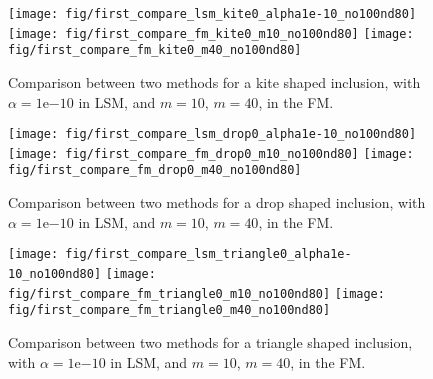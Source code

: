 \begin{center}
\begin{figure}%
{
\texttt{[image: fig/first\_compare\_lsm\_kite0\_alpha1e-10\_no100nd80]}
}
{
\texttt{[image: fig/first\_compare\_fm\_kite0\_m10\_no100nd80]}
}
{
\texttt{[image: fig/first\_compare\_fm\_kite0\_m40\_no100nd80]}
}
\caption{Comparison between two methods for a kite shaped inclusion, with $\alpha=\mathrm{1e}{-10}$ 
in LSM, and $m=10$, $m=40$, in the FM.}
\label{fig:first_compare_kite}
\end{figure}
\end{center}
\begin{center}
\begin{figure}%
{
\texttt{[image: fig/first\_compare\_lsm\_drop0\_alpha1e-10\_no100nd80]}
}
{
\texttt{[image: fig/first\_compare\_fm\_drop0\_m10\_no100nd80]}
}
{
\texttt{[image: fig/first\_compare\_fm\_drop0\_m40\_no100nd80]}
}
\caption{Comparison between two methods for a drop shaped inclusion, with $\alpha=\mathrm{1e}{-10}$ 
in LSM, and $m=10$, $m=40$, in the FM.}
\label{fig:first_compare_drop}
\end{figure}
\end{center}
\begin{center}
\begin{figure}%
{
\texttt{[image: fig/first\_compare\_lsm\_triangle0\_alpha1e-10\_no100nd80]}
}
{
\texttt{[image: fig/first\_compare\_fm\_triangle0\_m10\_no100nd80]}
}
{
\texttt{[image: fig/first\_compare\_fm\_triangle0\_m40\_no100nd80]}
}
\caption{Comparison between two methods for a triangle shaped inclusion, with $\alpha=\mathrm{1e}{-10}$ 
in LSM, and $m=10$, $m=40$, in the FM.}
\label{fig:first_compare_triangle}
\end{figure}
\end{center}

